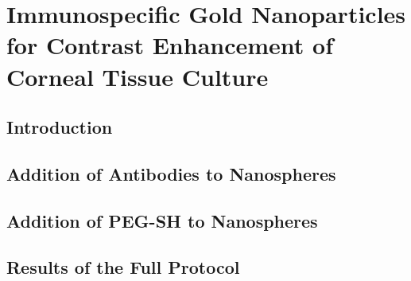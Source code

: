 
\def\mytitle{Theo DuBose Thesis}

\def\bibliocommand{}
\part{Immunospecific Gold Nanoparticles for Contrast Enhancement of Corneal Tissue Culture}
\label{immunospecificgoldnanoparticlesforcontrastenhancementofcornealtissueculture}

\chapter{Introduction}
\label{introduction}



\chapter{Addition of Antibodies to Nanospheres}
\label{additionofantibodiestonanospheres}



\chapter{Addition of PEG-SH to Nanospheres}
\label{additionofpeg-shtonanospheres}



\chapter{Results of the Full Protocol}
\label{resultsofthefullprotocol}






